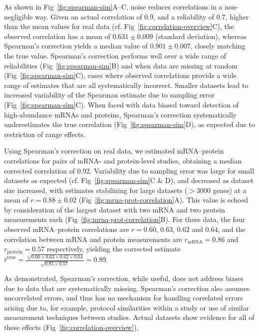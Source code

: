 \documentclass[10pt]{article}
\begin{document}
As shown in Fig~\ref{fig:spearman-sim}A--C, noise reduces correlations in a
non-negligible way. Given an actual correlation of 0.9, and a reliability of 0.7, higher than the mean values
for real data (cf. Fig~\ref{fig:correlation-overview}C), the observed 
correlation has a mean of $0.631 \pm 0.009$
(standard deviation), whereas Spearman's correction yields a median value of
$0.901 \pm 0.007$, closely matching the true value. Spearman's correction performs well over a wide range of
reliabilities (Fig~\ref{fig:spearman-sim}B) and when data are missing at
random (Fig~\ref{fig:spearman-sim}C), cases where observed correlations
provide a wide range of estimates that are all systematically incorrect. Smaller datasets lead to
increased variability of the Spearman estimate due to sampling error (Fig~\ref{fig:spearman-sim}C). When faced with data biased toward detection of high-abundance mRNAs and proteins, Spearman's correction systematically
underestimates the true correlation (Fig~\ref{fig:spearman-sim}D), as expected due to restriction of range effects.

Using Spearman's correction on real data, we estimated mRNA--protein
correlations for pairs of mRNA- and protein-level studies, obtaining a median corrected
correlation of \(0.92\). Variability due to sampling error was 
large for small datasets as expected (cf. Fig~\ref{fig:spearman-sim}C \& D), and
decreased as dataset size increased, with estimates stabilizing for large
datasets (\(>3000\) genes) at a mean of \(r=0.88\pm 0.02\)
(Fig~\ref{fig:mrna-prot-correlation}A). This value is echoed by consideration of the
largest dataset with two mRNA \cite{lipson09,yassour09} and two
protein \cite{degodoy08,ghaemmaghami03} measurements each (Fig~\ref{fig:mrna-prot-correlation}B). For these
data, the four observed mRNA--protein correlations are \(r=0.60\),
\(0.63\), \(0.62\) and \(0.64\), and the correlation between mRNA
and protein measurements are \(r_\text{mRNA}=0.86\) and
\(r_\text{protein}=0.57\) respectively, yielding the corrected
estimate \(\hat{r}^\text{true}=%
\frac{\sqrt[4]{0.60\times 0.63\times 0.62\times 0.64}}%
     {\sqrt{0.85\times 0.57}}=0.89\).

As demonstrated, Spearman's correction, while useful, does not address biases
due to data that are systematically missing. Spearman's correction also
assumes uncorrelated errors, and thus has no mechanism for handling correlated errors
arising due to, for example, protocol similarities within a study or use of
similar measurement techniques between studies. Actual datasets show
evidence for all of these effects (Fig~\ref{fig:correlation-overview}).
\end{document}
